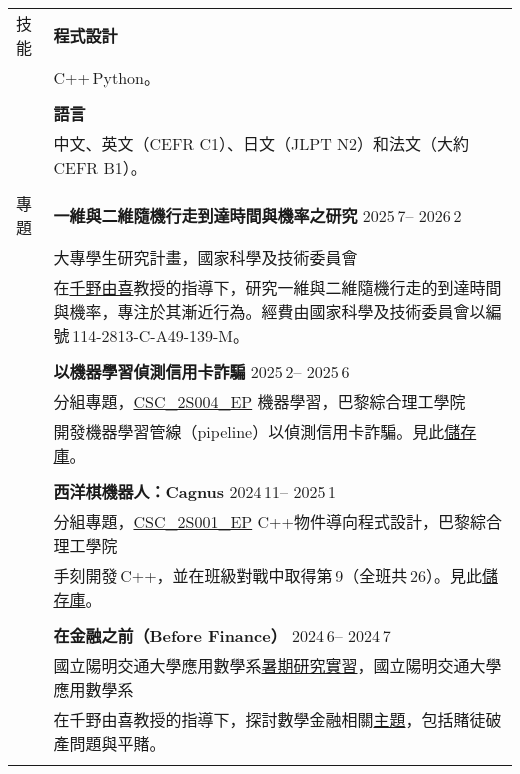 \documentclass[letterpaper, 11pt]{article}
\newcommand{\ms}{\,}
\begin{document}
\begin{CJK*}{UTF8}{bkai}
\begin{center}
\begin{longtable}{p{0.72in}p{5.97in}}
        {\textcolor{OliveGreen}{技能}} 
        & \textbf{程式設計}\\
        & C++\ms Python。 \\
        & \\
        
        & \textbf{語言} \\
        & 中文、英文（CEFR C1）、日文（JLPT N2）和法文（大約\ms CEFR B1）。 \\
        & \\
        
        {\textcolor{OliveGreen}{專題}} & \textbf{一維與二維隨機行走到達時間與機率之研究} \hfill 2025\ms7 -- 2026\ms2 \\
        & 大專學生研究計畫，國家科學及技術委員會 \\
        & 在\href{https://scholar.nycu.edu.tw/en/persons/yuki-chino}{千野由喜}教授的指導下，研究一維與二維隨機行走的到達時間與機率，專注於其漸近行為。經費由國家科學及技術委員會以編號\ms114-2813-C-A49-139-M。\\
        & \\

        & \textbf{以機器學習偵測信用卡詐騙} \hfill 2025\ms2 -- 2025\ms6 \\ 
        & 分組專題，\href{https://synapses.polytechnique.fr/catalogue/2024-2025/ue/47/CSC-2S004-EP-machine-learning?from=D12}{CSC\_2S004\_EP} 機器學習，巴黎綜合理工學院 \\
        & 開發機器學習管線（pipeline）以偵測信用卡詐騙。見此\href{https://github.com/eiken59/ml_project/blob/main/README.md}{儲存庫}。\\
        & \\

        & \textbf{西洋棋機器人：Cagnus} \hfill 2024\ms11 -- 2025\ms1 \\
        & 分組專題，\href{https://synapses.polytechnique.fr/catalogue/2024-2025/ue/32/CSC-2F001-EP-object-oriented-programming-in-c?from=D12}{CSC\_2S001\_EP} C++物件導向程式設計，巴黎綜合理工學院 \\
        & 手刻開發\ms C++，並在班級對戰中取得第\ms9（全班共\ms26）。見此\href{https://github.com/jetzypetz/chess_bot/blob/main/docs/README.md}{儲存庫}。\\
        & \\

        & \textbf{在金融之前（Before Finance）} \hfill 2024\ms6 -- 2024\ms7 \\
        & 國立陽明交通大學應用數學系\href{https://teshenglin.github.io/courses/2024_summer_research/}{暑期研究實習}，國立陽明交通大學應用數學系 \\
        & 在千野由喜教授的指導下，探討數學金融相關\href{https://hackmd.io/@eiken-sc11/B1QcaW3B0}{主題}，包括賭徒破產問題與平賭。\\
        & \\


\end{longtable}
\end{center}
\end{CJK*}
\end{document}

